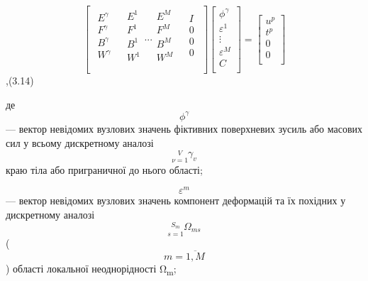 \[{\begin{bmatrix}
\begin{matrix}
E^{\gamma} \\
F^{\gamma} \\
B^{\gamma} \\
W^{\gamma} \\
\end{matrix} & {\begin{matrix}
E^{1} \\
F^{1} \\
B^{1} \\
W^{1} \\
\end{matrix}\text{.}\text{.}\text{.}\begin{matrix}
E^{M} \\
F^{M} \\
B^{M} \\
W^{M} \\
\end{matrix}} & \begin{matrix}
I \\
0 \\
0 \\
0 \\
\end{matrix} \\
\end{bmatrix}{\begin{bmatrix}
\phi^{\gamma} \\
\varepsilon^{1} \\
 \vdots \\
\varepsilon^{M} \\
C \\
\end{bmatrix} = \begin{bmatrix}
u^{p} \\
t^{p} \\
0 \\
0 \\
\end{bmatrix}}}{}\],(3.14)

де \[\phi^{\gamma}{}\] --- вектор невідомих вузлових значень фіктивних
поверхневих зусиль або масових сил у всьому дискретному аналозі
\[{\underset{\nu = 1}{\overset{V}{}}\gamma_{v}}{}\] краю тіла або
приграничної до нього області;

\[\varepsilon^{m}{}\] --- вектор невідомих вузлових значень компонент
деформацій та їх похідних у дискретному аналозі
\[{\underset{s = 1}{\overset{S_{m}}{}}\Omega_{\mathit{\text{ms}}}}{}\]
(\[{m = \overline{1,M}}{}\]) області локальної неоднорідності
Ω\textsubscript{m};

